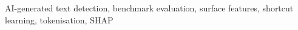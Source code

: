 \documentclass[conference,a4paper]{IEEEtran}
\begin{document}
\begin{IEEEkeywords}
AI-generated text detection, benchmark evaluation, surface features, shortcut learning, tokenisation, SHAP
\end{IEEEkeywords}



\end{document}
